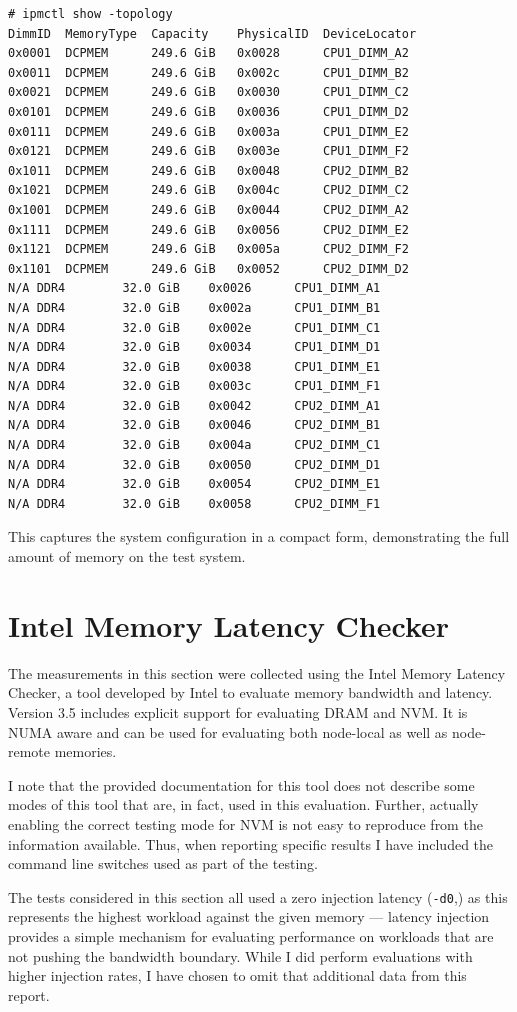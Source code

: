 \begin{verbatim}
# ipmctl show -topology
DimmID	MemoryType	Capacity	PhysicalID	DeviceLocator
0x0001	DCPMEM		249.6 GiB	0x0028		CPU1_DIMM_A2
0x0011	DCPMEM		249.6 GiB	0x002c		CPU1_DIMM_B2
0x0021	DCPMEM		249.6 GiB	0x0030		CPU1_DIMM_C2
0x0101	DCPMEM		249.6 GiB	0x0036		CPU1_DIMM_D2
0x0111	DCPMEM		249.6 GiB	0x003a		CPU1_DIMM_E2
0x0121	DCPMEM		249.6 GiB	0x003e		CPU1_DIMM_F2
0x1011	DCPMEM		249.6 GiB	0x0048		CPU2_DIMM_B2
0x1021	DCPMEM		249.6 GiB	0x004c		CPU2_DIMM_C2
0x1001	DCPMEM		249.6 GiB	0x0044		CPU2_DIMM_A2
0x1111	DCPMEM		249.6 GiB	0x0056		CPU2_DIMM_E2
0x1121	DCPMEM		249.6 GiB	0x005a		CPU2_DIMM_F2
0x1101	DCPMEM		249.6 GiB	0x0052		CPU2_DIMM_D2
N/A	DDR4		32.0 GiB	0x0026		CPU1_DIMM_A1
N/A	DDR4		32.0 GiB	0x002a		CPU1_DIMM_B1
N/A	DDR4		32.0 GiB	0x002e		CPU1_DIMM_C1
N/A	DDR4		32.0 GiB	0x0034		CPU1_DIMM_D1
N/A	DDR4		32.0 GiB	0x0038		CPU1_DIMM_E1
N/A	DDR4		32.0 GiB	0x003c		CPU1_DIMM_F1
N/A	DDR4		32.0 GiB	0x0042		CPU2_DIMM_A1
N/A	DDR4		32.0 GiB	0x0046		CPU2_DIMM_B1
N/A	DDR4		32.0 GiB	0x004a		CPU2_DIMM_C1
N/A	DDR4		32.0 GiB	0x0050		CPU2_DIMM_D1
N/A	DDR4		32.0 GiB	0x0054		CPU2_DIMM_E1
N/A	DDR4		32.0 GiB	0x0058		CPU2_DIMM_F1
\end{verbatim}

This captures the system configuration in a compact form, demonstrating the full amount of memory on
the test system.


\section{Intel Memory Latency Checker}

The measurements in this section were collected using the Intel Memory Latency Checker, a tool
developed by Intel to evaluate memory bandwidth and latency.  Version 3.5 includes explicit
support for evaluating DRAM and NVM.  It is NUMA aware and can be used for evaluating both
node-local as well as node-remote memories.~\cite{IntelMLC35}

I note that the provided documentation for this tool does not describe some modes of
this tool that are, in fact, used in this evaluation.  Further, actually enabling the
correct testing mode for NVM is not easy to reproduce from the information available.
Thus, when reporting specific results I have included the command line switches used
as part of the testing. 

The tests considered in this section all used a zero injection latency (\texttt{-d0},)
as this represents the highest workload against the given memory --- latency injection
provides a simple mechanism for evaluating performance on workloads that are not
pushing the bandwidth boundary.  While I did perform evaluations with higher
injection rates, I have chosen to omit that additional data from this report.

